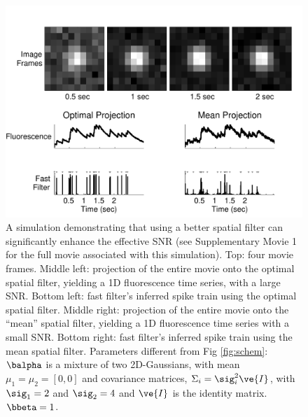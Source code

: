 \begin{figure}[H]
\centering \includegraphics[width=.9\linewidth]{../figs/spatial}
\caption{A simulation demonstrating that using a better spatial filter can significantly enhance the effective SNR (see Supplementary Movie 1 for the full movie associated with this simulation).  Top: four movie frames.  Middle left: projection of the entire movie onto the optimal spatial filter, yielding a 1D fluorescence time series, with a large SNR. Bottom left: fast filter's inferred spike train using the optimal spatial filter.  Middle right: projection of the entire movie onto the ``mean'' spatial filter, yielding a 1D fluorescence time series with a small SNR. Bottom right: fast filter's inferred spike train using the mean spatial filter. Parameters different from Fig \ref{fig:schem}: $\balpha$ is a mixture of two 2D-Gaussians, with mean $\mu_1=\mu_2=[0, 0]$ and covariance matrices, $\Sigma_i=\sig_i^2 \ve{I}$, with $\sig_1=2$ and $\sig_2=4$ and $\ve{I}$ is the identity matrix. $\bbeta=1$.} \label{fig:spatial} \end{figure} 

